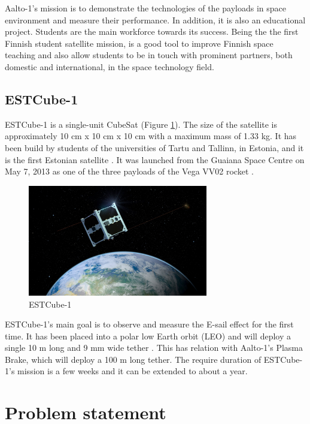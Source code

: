 Aalto-1's mission is to demonstrate the technologies of the payloads in space environment and measure their performance. In addition, it is also an educational project. Students are the main workforce towards its success. Being the the first Finnish student satellite mission, is a good tool to improve Finnish space teaching and also allow students to be in touch with prominent partners, both domestic and international, in the space technology field.


\subsection{ESTCube-1}

ESTCube-1 is a single-unit CubeSat (Figure \ref{f1.5}). The size of the satellite is approximately 10 cm x 10 cm x 10 cm with a maximum mass of 1.33 kg. It has been build by students of the universities of Tartu and Tallinn, in Estonia, and it is the first Estonian satellite \cite{ESTCube}.
It was launched from the Guaiana Space Centre on May 7, 2013 as one of the three payloads of the Vega VV02 rocket \cite{Arianespace}.\\

\begin{figure}[H]
\centerline{\includegraphics[width=0.7\textwidth]{images/ESTCube.jpg}}
\caption{ESTCube-1}
\label{f1.5}
\end{figure}

ESTCube-1's main goal is to observe and measure the E-sail effect for the first time. It has been placed into a polar low Earth orbit (LEO) and will deploy a single 10 m long and 9 mm wide tether \cite{ESTCube}. This has relation with Aalto-1's Plasma Brake, which will deploy a 100 m long tether. The require duration of ESTCube-1's mission is a few weeks and it can be extended to about a year.


\section{Problem statement}\label{1.2}

